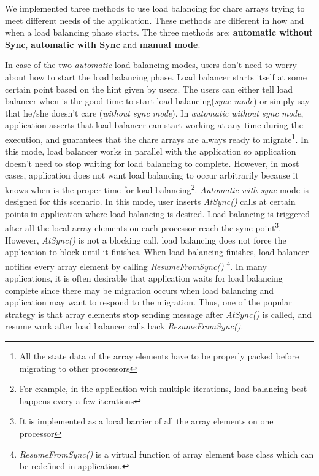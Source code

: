 We implemented three methods to use load balancing for chare arrays
trying to meet different needs of the application. These methods
are different in how and when a load balancing phase starts.
The three methods are: {\bf automatic without Sync}, 
{\bf automatic with Sync} and {\bf manual mode}.

In case of the two {\em automatic} load balancing modes, users don't need 
to worry about how to start the load balancing phase. Load balancer 
starts itself at some certain point based on the hint given by users. 
The users can either tell load balancer when is the good time to start 
load balancing({\em sync mode}) or simply say that he/she doesn't care
({\em without sync mode}). 
In {\em automatic without sync mode}, application asserts
that load balancer can start working at any time during the execution, and 
guarantees that the chare arrays are always ready to 
migrate\footnote{All the state data of the array elements have to be 
properly packed before migrating to 
other processors}. In this mode, load balancer works in parallel with 
the application so application doesn't need to stop waiting for load 
balancing to complete. However, in most cases, 
application does not want load balancing to occur arbitrarily because it knows 
when is the proper time for load balancing\footnote{For example, in the 
application with multiple iterations, load balancing best happens 
every a few iterations}. {\em Automatic with sync} mode is designed for this 
scenario. In this mode, user inserts {\em AtSync()} calls at certain points 
in application where load balancing is desired. Load balancing is triggered 
after all the local array elements on each processor reach the sync 
point\footnote{It is implemented as a local barrier of all the array elements
on one processor}. However, {\em AtSync()} is not a blocking call, 
load balancing does not force the application to block until it  
finishes. When load balancing finishes, load balancer notifies every array
element by calling {\em ResumeFromSync()}
\footnote{{\em ResumeFromSync()} is a virtual function of array element
base class which can be redefined in application.}. In many applications,
it is often desirable that application waits for load balancing complete since
there may be migration occurs when load balancing and application may want to
respond to the migration. Thus, one of the popular strategy is that array
elements stop sending message after {\em AtSync()} is called, and resume 
work after load balancer calls back {\em ResumeFromSync()}.

